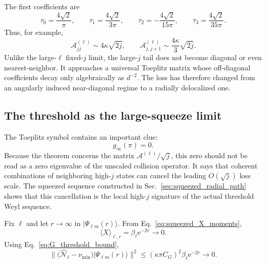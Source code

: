 \documentclass[11pt]{article}
\numberwithin{equation}{section}
\newcommand{\e}{\mathrm e}
\theoremstyle{definition}
\begin{document}
The first coefficients are
\begin{equation}
 \tau_0=\frac{4\sqrt2}{\pi},
 \qquad
 \tau_1=\frac{4\sqrt2}{3\pi},
 \qquad
 \tau_2=-\frac{4\sqrt2}{15\pi},
 \qquad
 \tau_3=\frac{4\sqrt2}{35\pi}.
\end{equation}
Thus, for example,
\begin{equation}
 \mathcal A^{(\ell)}_{jj}
 \sim
 4\kappa\sqrt{2j},
 \qquad
 \mathcal A^{(\ell)}_{j,j+1}
 \sim
 \frac{4\kappa}{3}\sqrt{2j}.
 \label{eq:largej_first}
\end{equation}
Unlike the large-$\ell$ fixed-$j$ limit, the large-$j$ tail does not become
diagonal or even nearest-neighbor.  It approaches a universal Toeplitz matrix
whose off-diagonal coefficients decay only algebraically as $d^{-2}$.  The
loss has therefore changed from an angularly induced near-diagonal regime to a
radially delocalized one.

\subsection{The threshold as the large-squeeze limit}

The Toeplitz symbol contains an important clue:
\begin{equation}
 g_\infty(\pi)=0.
 \label{eq:toeplitz_zero}
\end{equation}
Because the theorem concerns the matrix $\mathcal A^{(\ell)}/\sqrt j$,
this zero should not
be read as a zero eigenvalue of the unscaled collision operator.  It says that
coherent combinations of neighboring high-$j$ states can cancel the leading
$O(\sqrt j)$ loss scale.  The squeezed sequence constructed in
Sec.~\ref{sec:squeezed_radial_path} shows that this cancellation is the local
high-$j$ signature of the actual threshold Weyl sequence.

Fix $\ell$ and let $r\to\infty$ in
$|\Psi_{\ell m}(r)\rangle$.  From Eq.~\eqref{eq:squeezed_X_moments},
\begin{equation}
 \langle X\rangle_{\ell,r}=\beta_\ell\e^{-2r}\longrightarrow0.
\end{equation}
Using Eq.~\eqref{eq:G_threshold_bound},
\begin{equation}
 \|\bigl(\widehat{\mathcal N}_\ell-\nu_{\min}\bigr)
 |\Psi_{\ell m}(r)\rangle\|^2
 \le
 (\kappa\pi C_G)^2\beta_\ell\e^{-2r}
 \longrightarrow0.
 \label{eq:weyl_loss_norm}
\end{equation}
\end{document}
